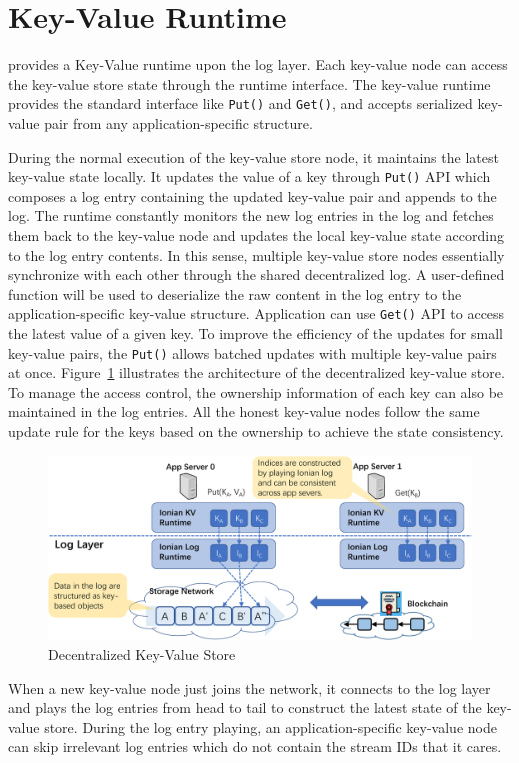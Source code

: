 \section{Key-Value Runtime}

\project provides a Key-Value runtime upon the log layer. 
Each key-value node can access the key-value store state through the runtime interface. 
The key-value runtime provides the standard interface like \texttt{Put()} and \texttt{Get()}, and accepts serialized key-value pair from any application-specific structure. 

During the normal execution of the key-value store node, it maintains the latest key-value state locally. It updates the value of a key through \texttt{Put()} API which composes a log entry containing the updated key-value pair and appends to the log. 
The runtime constantly monitors the new log entries in the log and fetches them back to the key-value node and updates the local key-value state according to the log entry contents. 
In this sense, multiple key-value store nodes essentially synchronize with each other through the shared decentralized log.
A user-defined function will be used to deserialize the raw content in the log entry to the application-specific key-value structure.
Application can use \texttt{Get()} API to access the latest value of a given key. 
To improve the efficiency of the updates for small key-value pairs, the \texttt{Put()} allows batched updates with multiple key-value pairs at once. 
Figure~\ref{fig:kv} illustrates the architecture of the decentralized key-value store. 
To manage the access control, the ownership information of each key can also be maintained in the log entries.
All the honest key-value nodes follow the same update rule for the keys based on the ownership to achieve the state consistency.

\begin{figure}[H]	
	\includegraphics[width=\textwidth]{figure/kv-crop.pdf}
	\caption{Decentralized Key-Value Store}
	\label{fig:kv}
\end{figure}

When a new key-value node just joins the network, it connects to the log layer and plays the log entries from head to tail to construct the latest state of the key-value store.
During the log entry playing, an application-specific key-value node can skip irrelevant log entries which do not contain the stream IDs that it cares.
